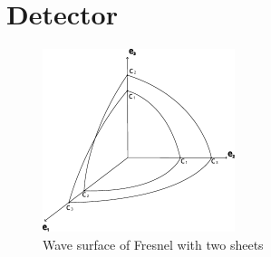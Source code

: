 \documentclass[11pt,a4paper,faculty=we,language=en,doctype=report]{cls/ugent-doc}
\begin{document}
\chapter{Detector}
\begin{figure}
  \centering
  \includegraphics[width=0.5\textwidth]{figures/Fresnel.pdf}
  \caption{Wave surface of Fresnel with two sheets}
  \label{fig:Fresnel}
\end{figure}
\end{document}
